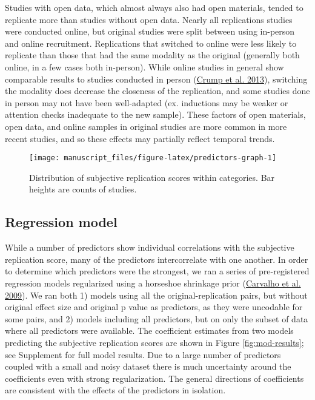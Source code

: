\documentclass[
  english,
  a4paper,
]{article}
\begin{document}
Studies with open data, which almost always also had open materials, tended to replicate more than studies without open data. Nearly all replications studies were conducted online, but original studies were split between using in-person and online recruitment. Replications that switched to online were less likely to replicate than those that had the same modality as the original (generally both online, in a few cases both in-person). While online studies in general show comparable results to studies conducted in person (\protect\hyperlink{ref-crump2013}{Crump et al. 2013}), switching the modality does decrease the closeness of the replication, and some studies done in person may not have been well-adapted (ex. inductions may be weaker or attention checks inadequate to the new sample). These factors of open materials, open data, and online samples in original studies are more common in more recent studies, and so these effects may partially reflect temporal trends.

\begin{figure}[ht]
\texttt{[image: manuscript\_files/figure-latex/predictors-graph-1]} \caption{Distribution of subjective replication scores within categories. Bar heights are counts of studies.}\label{fig:predictors-graph}
\end{figure}

\hypertarget{regression-model}{%
\subsection{Regression model}\label{regression-model}}

While a number of predictors show individual correlations with the subjective replication score, many of the predictors intercorrelate with one another. In order to determine which predictors were the strongest, we ran a series of pre-registered regression models regularized using a horseshoe shrinkage prior (\protect\hyperlink{ref-carvalho09}{Carvalho et al. 2009}). We ran both 1) models using all the original-replication pairs, but without original effect size and original p value as predictors, as they were uncodable for some pairs, and 2) models including all predictors, but on only the subset of data where all predictors were available. The coefficient estimates from two models predicting the subjective replication scores are shown in Figure \ref{fig:mod-results}; see Supplement for full model results. Due to a large number of predictors coupled with a small and noisy dataset there is much uncertainty around the coefficients even with strong regularization. The general directions of coefficients are consistent with the effects of the predictors in isolation.
\end{document}
